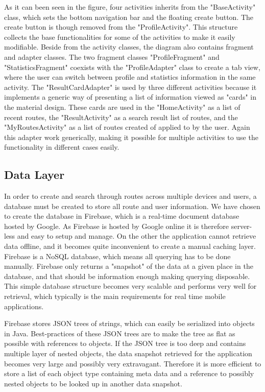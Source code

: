 As it can been seen in the figure, four activities inherits from the "BaseActivity" class, which sets the bottom navigation bar and the floating create button. The create button is though removed from the "ProfileActivity". 
This structure collects the base functionalities for some of the activities to make it easily modifiable.
Beside from the activity classes, the diagram also contains fragment and adapter classes. The two fragment classes "ProfileFragment" and "StatisticsFragment" coexists with the "ProfileAdapter" class to create a tab view, where the user can switch between profile and statistics information in the same activity. The "ResultCardAdapter" is used by three different activities because it implements a generic way of presenting a list of information viewed as "cards" in the material design. These cards are used in the "HomeActivity" as a list of recent routes, the "ResultActivity" as a search result list of routes, and the "MyRoutesActivity" as a list of routes created of applied to by the user. Again this adapter work generically, making it possible for multiple activities to use the functionality in different cases easily.

\subsection{Data Layer}
\label{sec:data_layer_design}

In order to create and search through routes across multiple devices and users, a database must be created to store all route and user information.
We have chosen to create the database in Firebase, which is a real-time document database hosted by Google. As Firebase is hosted by Google online it is therefore server-less and easy to setup and manage. On the other the application cannot retrieve data offline, and it becomes quite inconvenient to create a manual caching layer. Firebase is a NoSQL database, which means all querying has to be done manually. Firebase only returns a "snapshot" of the data at a given place in the database, and that should be information enough making querying disposable. This simple database structure becomes very scalable and performs very well for retrieval, which typically is the main requirements for real time mobile applications.

Firebase stores JSON trees of strings, which can easily be serialized into objects in Java. Best-practices of these JSON trees are to make the tree as flat as possible with references to objects. If the JSON tree is too deep and contains multiple layer of nested objects, the data snapshot retrieved for the application becomes very large and possibly very extravagant. Therefore it is more efficient to store a list of each object type containing meta data and a reference to possibly nested objects to be looked up in another data snapshot.

